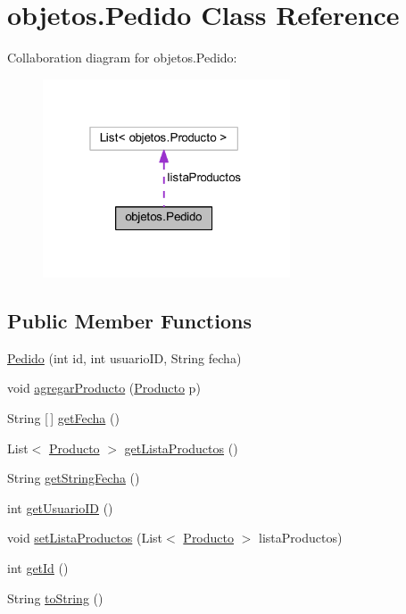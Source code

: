 \hypertarget{classobjetos_1_1_pedido}{}\section{objetos.\+Pedido Class Reference}
\label{classobjetos_1_1_pedido}


Collaboration diagram for objetos.\+Pedido\+:\nopagebreak
\begin{figure}[H]
\begin{center}
\leavevmode
\includegraphics[width=208pt]{classobjetos_1_1_pedido__coll__graph}
\end{center}
\end{figure}
\subsection*{Public Member Functions}
\begin{DoxyCompactItemize}
\item 
\mbox{\hyperlink{classobjetos_1_1_pedido_a2f4d8a34c054b61efca09e21891dc119}{Pedido}} (int id, int usuario\+ID, String fecha)
\item 
void \mbox{\hyperlink{classobjetos_1_1_pedido_ac1b1b41df8f346ef077017deccf269b5}{agregar\+Producto}} (\mbox{\hyperlink{classobjetos_1_1_producto}{Producto}} p)
\item 
String \mbox{[}$\,$\mbox{]} \mbox{\hyperlink{classobjetos_1_1_pedido_ad9981fc190fd02fbf4f9c44811fc2102}{get\+Fecha}} ()
\item 
List$<$ \mbox{\hyperlink{classobjetos_1_1_producto}{Producto}} $>$ \mbox{\hyperlink{classobjetos_1_1_pedido_a9e4f2c0942939a0defdea21140e85e94}{get\+Lista\+Productos}} ()
\item 
String \mbox{\hyperlink{classobjetos_1_1_pedido_af2c6fe4c929f1fce6443e3ffcb2c0a45}{get\+String\+Fecha}} ()
\item 
int \mbox{\hyperlink{classobjetos_1_1_pedido_afed5e1d427d944ead970861ef07be474}{get\+Usuario\+ID}} ()
\item 
void \mbox{\hyperlink{classobjetos_1_1_pedido_a642984750b50555899811e39208729b4}{set\+Lista\+Productos}} (List$<$ \mbox{\hyperlink{classobjetos_1_1_producto}{Producto}} $>$ lista\+Productos)
\item 
int \mbox{\hyperlink{classobjetos_1_1_pedido_a2cedae9fd179897d4d7e83b655d6fa58}{get\+Id}} ()
\item 
String \mbox{\hyperlink{classobjetos_1_1_pedido_a2db5b46450987a7f2fb289e19cf593ac}{to\+String}} ()
\end{DoxyCompactItemize}


